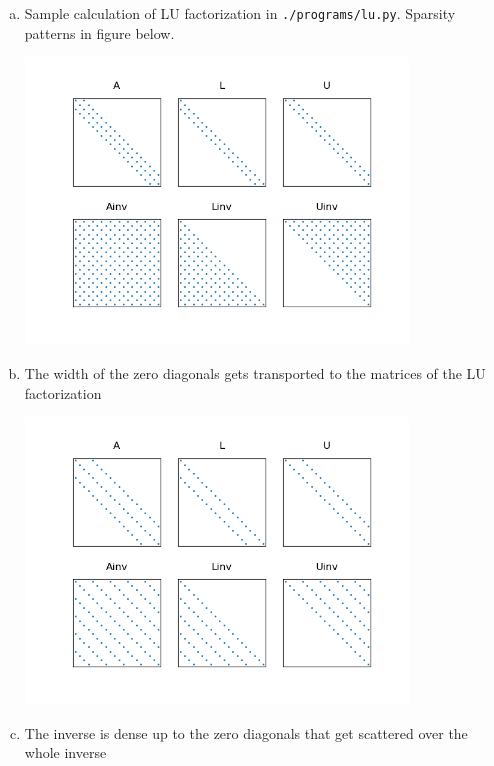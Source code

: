 
\begin{SolutionSheet}[\ref{sheet8}]

  \begin{Solution}
    \begin{enumerate}[(a)]
    \item Sample calculation of LU factorization in
      \lstinline{./programs/lu.py}. Sparsity patterns in figure below.

      \includegraphics[width=0.8\textwidth]{figures/lu-decomposition-of-sparse-matrix}
    \item The width of the zero diagonals gets transported to the
       matrices of the LU factorization

      \includegraphics[width=0.8\textwidth]{figures/lu-decomposition-of-sparse-matrix-off4}
    \item The inverse is dense up to the zero diagonals that get
      scattered over the whole inverse
    \end{enumerate}


\end{Solution}
\end{SolutionSheet}
